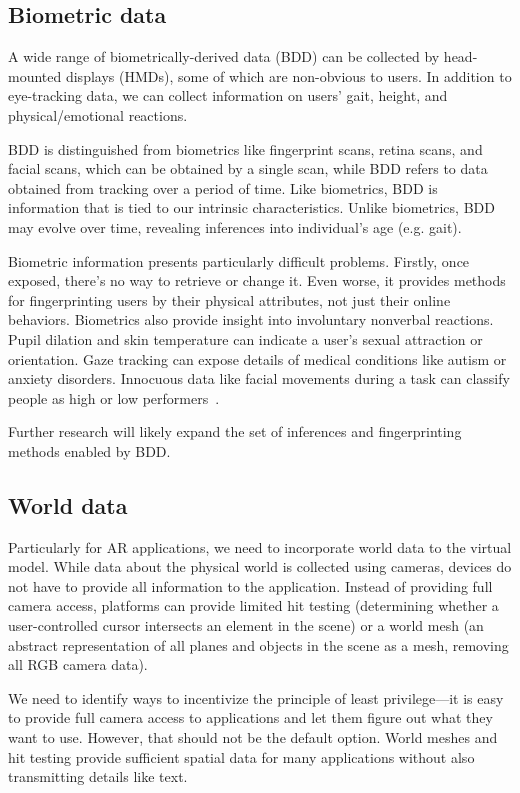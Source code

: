 \subsection{Biometric data}\label{sec:biometrics}
A wide range of biometrically-derived data (BDD) can be collected by head-mounted displays (HMDs), some of which are non-obvious to users. In addition to eye-tracking data, we can collect information on users' gait, height, and physical/emotional reactions.

BDD is distinguished from biometrics like fingerprint scans, retina scans, and facial scans, which can be obtained by a single scan, while BDD refers to data obtained from tracking over a period of time. Like biometrics, BDD is information that is tied to our intrinsic characteristics. Unlike biometrics, BDD may evolve over time, revealing inferences into individual's age (e.g. gait).

Biometric information presents particularly difficult problems. Firstly, once exposed, there's no way to retrieve or change it. Even worse, it provides methods for fingerprinting users by their physical attributes, not just their online behaviors. Biometrics also provide insight into involuntary nonverbal reactions\cite{bailenson2018protecting}. Pupil dilation and skin temperature can indicate a user's sexual attraction or orientation. Gaze tracking can expose details of medical conditions like autism or anxiety disorders. Innocuous data like facial movements during a task can classify people as high or low performers~\cite{jabon2011automatically}.

Further research will likely expand the set of inferences and fingerprinting methods enabled by BDD.

\subsection{World data}

Particularly for AR applications, we need to incorporate world data to the virtual model. While data about the physical world is collected using cameras, devices do not have to provide all information to the application. Instead of providing full camera access, platforms can provide limited hit testing (determining whether a user-controlled cursor intersects an element in the scene) or a world mesh (an abstract representation of all planes and objects in the scene as a mesh, removing all RGB camera data).

We need to identify ways to incentivize the principle of least privilege---it is easy to provide full camera access to applications and let them figure out what they want to use. However, that should not be the default option. World meshes and hit testing provide sufficient spatial data for many applications without also transmitting details like text.

